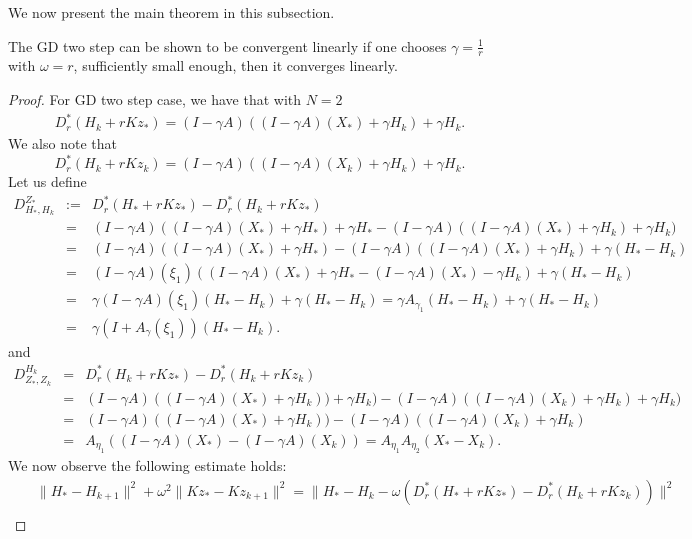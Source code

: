 \begin{itemize}
We now present the main theorem in this subsection. 
\begin{lemma} 
The GD two step can be shown to be convergent linearly if one chooses $\gamma = \frac{1}{r}$ with $\omega = r$, sufficiently small enough, then it converges linearly.
\end{lemma} 
\begin{proof} 
For GD two step case, we have that with $N = 2$
\begin{eqnarray*}
D_r^*(H_k + rKz_*) = (I - \gamma A)((I - \gamma A)(X_*) + \gamma H_k) + \gamma H_k.  
\end{eqnarray*}
We also note that  
\begin{equation*}
D_r^*(H_k + rKz_k) = (I - \gamma A)((I - \gamma A)(X_k) + \gamma H_k) + \gamma H_k.  
\end{equation*}
Let us define 
\begin{eqnarray*}
D_{H_*,H_k}^{Z_*} &:=& D_r^{*} (H_* + rK z_*) - D_r^*(H_k + rKz_*) \\
&=& (I - \gamma A)((I - \gamma A)(X_*) + \gamma H_*) + \gamma H_* - (I - \gamma A)((I - \gamma A)(X_*) + \gamma H_k) + \gamma H_k)  \\
&=& (I - \gamma A)((I - \gamma A)(X_*) + \gamma H_*) - (I - \gamma A)((I - \gamma A)(X_*) + \gamma H_k) + \gamma (H_* - H_k) \\ 
&=& (I - \gamma A)(\xi_1) ( (I - \gamma A)(X_*) + \gamma H_* - (I - \gamma A)(X_*) - \gamma H_k ) + \gamma (H_* - H_k) \\ 
&=& \gamma (I - \gamma A)(\xi_1)(H_* - H_k) + \gamma (H_* - H_k) = \gamma A_{\gamma_1} (H_* - H_k) + \gamma (H_* - H_k) \\
&=& \gamma (I +  A_\gamma(\xi_1)) (H_* - H_k). 
\end{eqnarray*}
and 
\begin{eqnarray*}
D_{Z_*,Z_k}^{H_k} &=& D_r^*(H_k + rKz_*) - D_r^*(H_k + rKz_k) \\
&=& (I - \gamma A)((I - \gamma A)(X_*) + \gamma H_k)) + \gamma H_k) - (I - \gamma A)((I - \gamma A)(X_k) + \gamma H_k) + \gamma H_k) \\ 
&=& (I - \gamma A)((I - \gamma A)(X_*) + \gamma H_k)) - (I - \gamma A)((I - \gamma A)(X_k) + \gamma H_k) \\ 
&=& A_{\eta_1} ((I - \gamma A)(X_*) - (I - \gamma A)(X_k)) = A_{\eta_1} A_{\eta_2} (X_*  - X_k). 
\end{eqnarray*}
We now observe the following estimate holds: 
\begin{eqnarray*}
&& \|H_* - H_{k+1}\|^2 + \omega^2 \|Kz_{*} - Kz_{k+1}\|^2 = \|H_* - H_k - \omega (D_r^{*} (H_* + r K z_*) - D_r^{*} (H_k + r K z_k))\|^2 \\ 

\end{eqnarray*}
\end{proof}
\end{itemize}

